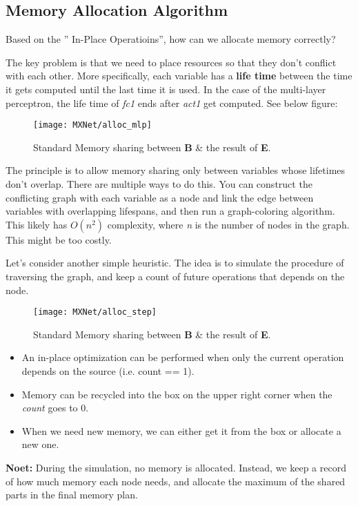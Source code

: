 \subsection{Memory Allocation Algorithm}
Based on the '' In-Place Operatioins'', how can we allocate memory correctly?

The key problem is that we need to place resources so that they don’t conflict with each other. More specifically, each variable has a \textbf{life time} between the time it gets computed until the last time it is used. In the case of the multi-layer perceptron, the life time of \textit{fc1} ends after \textit{act1} get computed.
See below figure:
\begin{figure}[!hbtp]
\centering
\texttt{[image: MXNet/alloc\_mlp]}
\caption{Standard Memory sharing between \textbf{B} \& the result of \textbf{E}.}
\end{figure}

The principle is to allow memory sharing only between variables whose lifetimes don’t overlap. There are multiple ways to do this. You can construct the conflicting graph with each variable as a node and link the edge between variables with overlapping lifespans, and then run a graph-coloring algorithm. This likely has $O(n^2)$ complexity, where \textit{n} is the number of nodes in the graph. This might be too costly.

Let’s consider another simple heuristic. The idea is to simulate the procedure of traversing the graph, and keep a count of future operations that depends on the node.
\begin{figure}[!hbtp]
\centering
\texttt{[image: MXNet/alloc\_step]}
\caption{Standard Memory sharing between \textbf{B} \& the result of \textbf{E}.}
\end{figure}
\begin{itemize}
\item An in-place optimization can be performed when only the current operation depends on the source (i.e. count == 1).
\item Memory can be recycled into the box on the upper right corner when the \textit{count} goes to 0.
\item When we need new memory, we can either get it from the box or allocate a new one. 
\end{itemize}

\textbf{Noet:} During the simulation, no memory is allocated. Instead, we keep a record of how much memory each node needs, and allocate the maximum of the shared parts in the final memory plan.

